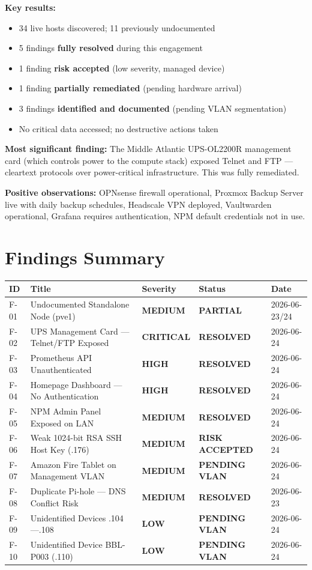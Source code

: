 \documentclass[11pt,a4paper]{article}
\newcommand{\critical}{\colorbox{critical}{\color{white}\small\textbf{CRITICAL}}}
\newcommand{\high}{\colorbox{high}{\color{white}\small\textbf{HIGH}}}
\newcommand{\medium}{\colorbox{medium}{\color{white}\small\textbf{MEDIUM}}}
\newcommand{\low}{\colorbox{low}{\color{white}\small\textbf{LOW}}}
\newcommand{\resolved}{\colorbox{resolved}{\color{white}\small\textbf{RESOLVED}}}
\newcommand{\riskaccepted}{\colorbox{accepted}{\color{white}\small\textbf{RISK ACCEPTED}}}
\newcommand{\partialstatus}{\colorbox{partial}{\color{white}\small\textbf{PARTIAL}}}
\newcommand{\pendingvlan}{\colorbox{pending}{\color{white}\small\textbf{PENDING VLAN}}}
\begin{document}
\textbf{Key results:}
\begin{itemize}[nosep]
  \item 34 live hosts discovered; 11 previously undocumented
  \item 5 findings \textbf{fully resolved} during this engagement
  \item 1 finding \textbf{risk accepted} (low severity, managed device)
  \item 1 finding \textbf{partially remediated} (pending hardware arrival)
  \item 3 findings \textbf{identified and documented} (pending VLAN segmentation)
  \item No critical data accessed; no destructive actions taken
\end{itemize}

\textbf{Most significant finding:} The Middle Atlantic UPS-OL2200R management card (which
controls power to the compute stack) exposed Telnet and FTP — cleartext protocols over
power-critical infrastructure. This was fully remediated.

\textbf{Positive observations:} OPNsense firewall operational, Proxmox Backup Server live with
daily backup schedules, Headscale VPN deployed, Vaultwarden operational, Grafana requires
authentication, NPM default credentials not in use.

\section{Findings Summary}

\begin{longtable}{@{}p{1cm}p{5.5cm}p{2.5cm}p{2cm}p{2cm}@{}}
\toprule
\textbf{ID} & \textbf{Title} & \textbf{Severity} & \textbf{Status} & \textbf{Date} \\
\midrule
\endhead
F-01 & Undocumented Standalone Node (pve1) & \medium & \partialstatus & 2026-06-23/24 \\[3pt]
F-02 & UPS Management Card — Telnet/FTP Exposed & \critical & \resolved & 2026-06-24 \\[3pt]
F-03 & Prometheus API Unauthenticated & \high & \resolved & 2026-06-24 \\[3pt]
F-04 & Homepage Dashboard — No Authentication & \high & \resolved & 2026-06-24 \\[3pt]
F-05 & NPM Admin Panel Exposed on LAN & \medium & \resolved & 2026-06-24 \\[3pt]
F-06 & Weak 1024-bit RSA SSH Host Key (.176) & \medium & \riskaccepted & 2026-06-24 \\[3pt]
F-07 & Amazon Fire Tablet on Management VLAN & \medium & \pendingvlan & 2026-06-24 \\[3pt]
F-08 & Duplicate Pi-hole — DNS Conflict Risk & \medium & \resolved & 2026-06-23 \\[3pt]
F-09 & Unidentified Devices .104---.108 & \low & \pendingvlan & 2026-06-24 \\[3pt]
F-10 & Unidentified Device BBL-P003 (.110) & \low & \pendingvlan & 2026-06-24 \\
\bottomrule
\end{longtable}
\end{document}
